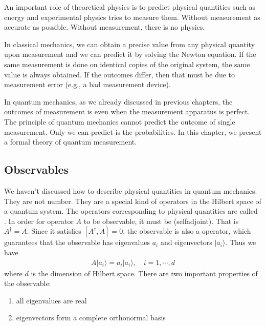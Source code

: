 \documentclass[letterpaper,10pt,english]{jupyterBook}
\begin{document}
\sphinxAtStartPar
An important role of theoretical physics is to predict physical quantities such as energy and experimental physics tries to measure them.  Without measurement as accurate as possible.  Without measurement, there is no physics.

\sphinxAtStartPar
In classical mechanics, we can obtain a precise value from any  physical quantity  upon measurement and we can predict it by solving the Newton equation.  If the same measurement is done on identical copies of the original system, the same value is always obtained. If the outcomes differ, then that must be due to measurement error (e.g., a bad measurement device).

\sphinxAtStartPar
In quantum mechanics, as we already discussed in previous chapters, the outcomes of measurement is  even when the measurement apparatus is perfect. The principle of quantum mechanics cannot predict the outcome of single measurement. Only we can predict is the probabilities.   In this chapter, we present a formal theory of quantum measurement.


\subsection{Observables}
\label{\detokenize{qmsummary/measurement:observables}}
\sphinxAtStartPar
{}

\sphinxAtStartPar
We haven’t discussed how to describe physical quantities in quantum mechanics.  They are not number.  They are a special kind of operators in the Hilbert space of a quantum system. The operators corresponding to physical quantities are called .
In order for operator \(A\) to be observable, it must be  (self\sphinxhyphen{}adjoint).  That is \(A^\dagger = A\).  Since it satisfies \([A^\dagger, A]=0\), the observable is also a  operator,  which guarantees that the observable has eigenvalues \(a_i\) and eigenvectors \(|a_i\rangle\).  Thus we have
\begin{equation*}
\begin{split}
A |a_i\rangle = a_i |a_i\rangle, \quad i=1,\cdots,d
\end{split}
\end{equation*}
\sphinxAtStartPar
where \(d\) is the dimension of Hilbert space.  There are two important properties of the observable:
\begin{enumerate}
%
\item {}
\sphinxAtStartPar
all eigenvalues are real

\item {}
\sphinxAtStartPar
eigenvectors form a complete orthonormal basis

\end{enumerate}
\end{document}
